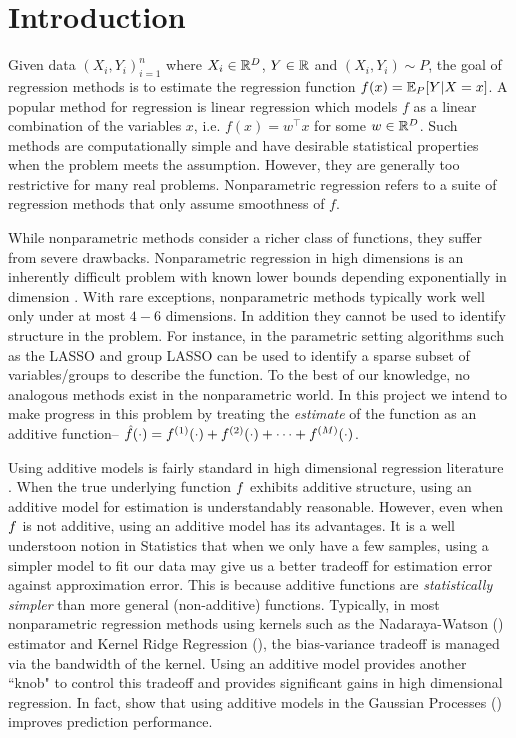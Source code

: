 

\section{Introduction}

Given data $(X_i,Y_i)_{i=1}^n$ where $X_i\in \mathbb{R}^D$, $Y\in\mathbb{R}$ and 
$(X_i,Y_i)\sim P$, the goal of
regression methods is to estimate the regression function $f(x) = \mathbb{E}_P[Y|X=x]$.
A popular method for regression is linear regression which models $f$ as a
linear combination of the variables $x$, i.e. $f(x) = w^\top x$ for some $w \in
\mathbb{R}^D$. Such methods are computationally simple and have desirable
statistical properties when the problem meets the assumption. However, they are generally
too restrictive for many real problems.
Nonparametric regression refers to a suite of regression methods that only
assume smoothness of $f$.

While nonparametric methods consider a richer class of functions, they suffer
from severe drawbacks.
Nonparametric regression in high dimensions is an inherently difficult problem with known
lower bounds depending exponentially in dimension
\citep{gyorfi02distributionfree}. 
With rare exceptions,
nonparametric methods typically work well only under at most $4-6$ dimensions.
In addition they cannot be used to identify
structure in the problem. For instance, in the parametric setting algorithms
such as the LASSO and group LASSO can be used to identify a sparse subset of
variables/groups to describe the function. To the best of our knowledge, no
analogous methods exist in the nonparametric world.
In this project we intend to make progress in this problem by treating the
\emph{estimate} of the function as
an additive function-- $\hat{f}(\cdot) = f^{(1)}(\cdot) + f^{(2)}(\cdot) +
\dots + f^{(M)}(\cdot)$.

Using additive models is fairly standard in high dimensional regression
literature
\cite{hastie90gam,ravikumar09spam,lafferty05rodeo}. 
When the true underlying function $f$ exhibits additive structure, using an additive
model for estimation is understandably reasonable. However, even when $f$ is
not additive, using an additive model has its advantages. 
It is a well understoon notion in Statistics that when we only have a few samples, using a
simpler model to fit our data may give us a better tradeoff for estimation error  
against approximation error. 
This is because additive functions are \emph{statistically simpler}
than more general (non-additive) functions.
Typically, in most nonparametric regression methods using kernels such as the
Nadaraya-Watson
(\nw) estimator and Kernel Ridge Regression (\krr), the bias-variance tradeoff
is managed via the bandwidth of the kernel. 
Using an additive model
provides another ``knob" to control this tradeoff and provides significant gains
in high dimensional regression. In fact, \citet{duvenaud11additivegps}
show that using additive models in the Gaussian Processes (\gp)
improves prediction performance.


